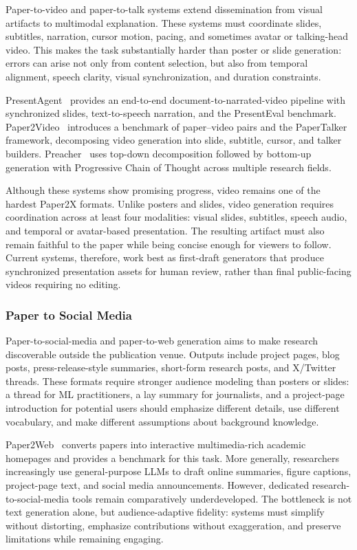 Paper-to-video and paper-to-talk systems extend dissemination from visual artifacts to multimodal explanation. These systems must coordinate slides, subtitles, narration, cursor motion, pacing, and sometimes avatar or talking-head video. This makes the task substantially harder than poster or slide generation: errors can arise not only from content selection, but also from temporal alignment, speech clarity, visual synchronization, and duration constraints.

PresentAgent~\cite{presentagent2025} provides an end-to-end document-to-narrated-video pipeline with synchronized slides, text-to-speech narration, and the PresentEval benchmark. Paper2Video~\cite{paper2video2025} introduces a benchmark of paper--video pairs and the PaperTalker framework, decomposing video generation into slide, subtitle, cursor, and talker builders. Preacher~\cite{preacher2025} uses top-down decomposition followed by bottom-up generation with Progressive Chain of Thought across multiple research fields.

Although these systems show promising progress, video remains one of the hardest Paper2X formats. Unlike posters and slides, video generation requires coordination across at least four modalities: visual slides, subtitles, speech audio, and temporal or avatar-based presentation. The resulting artifact must also remain faithful to the paper while being concise enough for viewers to follow. Current systems, therefore, work best as first-draft generators that produce synchronized presentation assets for human review, rather than final public-facing videos requiring no editing.



\subsubsection{Paper to Social Media}
\label{sec:paper2social}

Paper-to-social-media and paper-to-web generation aims to make research discoverable outside the publication venue. Outputs include project pages, blog posts, press-release-style summaries, short-form research posts, and X/Twitter threads. These formats require stronger audience modeling than posters or slides: a thread for ML practitioners, a lay summary for journalists, and a project-page introduction for potential users should emphasize different details, use different vocabulary, and make different assumptions about background knowledge.

Paper2Web~\cite{paper2web2025} converts papers into interactive multimedia-rich academic homepages and provides a benchmark for this task. More generally, researchers increasingly use general-purpose LLMs to draft online summaries, figure captions, project-page text, and social media announcements. However, dedicated research-to-social-media tools remain comparatively underdeveloped. The bottleneck is not text generation alone, but audience-adaptive fidelity: systems must simplify without distorting, emphasize contributions without exaggeration, and preserve limitations while remaining engaging.

